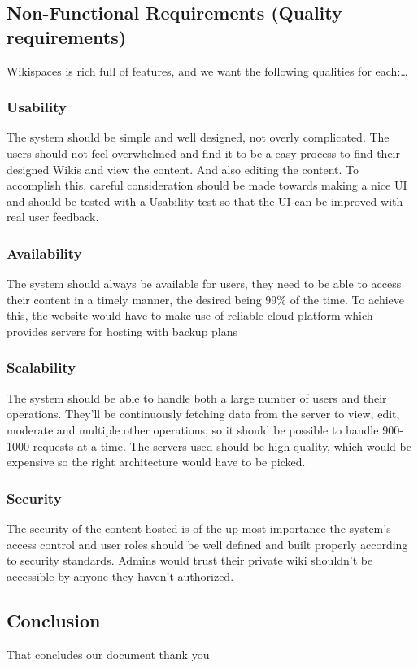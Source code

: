 \documentclass{article}
\begin{document}
\subsection{Non-Functional Requirements (Quality requirements)}

Wikispaces is rich full of features, and we want the following qualities for each:\dots

\subsubsection{Usability}

The system should be simple and well designed, not overly complicated. The users should not feel overwhelmed and find it to be a easy process to find their designed Wikis and view the content. And also editing the content. To accomplish this, careful consideration should be made towards making a nice UI and should be tested with a Usability test so that the UI can be improved with real user feedback.

\subsubsection{Availability}

The system should always be available for users, they need to be able to access their content in a timely manner, the desired being 99\% of the time. To achieve this, the website would have to make use of reliable cloud platform which provides servers for hosting with backup plans

\subsubsection{Scalability}

The system should be able to handle both a large number of users and their operations. They'll be continuously fetching data from the server to view, edit, moderate and multiple other operations, so it should be possible to handle 900-1000 requests at a time. The servers used should be high quality, which would be expensive so the right architecture would have to be picked.

\subsubsection{Security}

The security of the content hosted is of the up most importance the system's access control and user roles should be well defined and built properly according to security standards. Admins would trust their private wiki shouldn't be accessible by anyone they haven't authorized.

\subsection{Conclusion}
That concludes our document thank you



\end{document}
